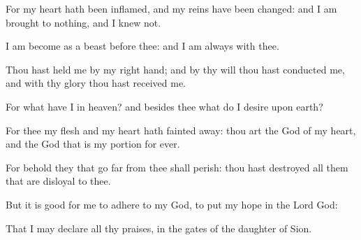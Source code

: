 \item For my heart hath been inflamed, and my reins have been changed: and I am brought to nothing, and I knew not.
\item I am become as a beast before thee: and I am always with thee.
\item Thou hast held me by my right hand; and by thy will thou hast conducted me, and with thy glory thou hast received me.
\item For what have I in heaven? and besides thee what do I desire upon earth?
\item For thee my flesh and my heart hath fainted away: thou art the God of my heart, and the God that is my portion for ever.
\item For behold they that go far from thee shall perish: thou hast destroyed all them that are disloyal to thee.
\item But it is good for me to adhere to my God, to put my hope in the Lord God:
\item That I may declare all thy praises, in the gates of the daughter of Sion.